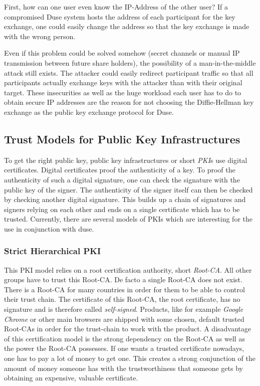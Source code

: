 First, how can one user even know the IP-Address of the other user? If a compromised
Duse system hosts the address of each participant for the key exchange, one could
easily change the address so that the key exchange is made with the wrong person.

Even if this problem could be solved somehow (secret channels or manual IP transmission
between future share holders), the possibility of a man-in-the-middle attack still
exists. The attacker could easily redirect participant traffic so that all participants
actually exchange keys with the attacker than with their original target.
These insecurities as well as the huge workload each user has to do to obtain
secure IP addresses are the reason for not choosing the Diffie-Hellman key exchange
as the public key exchange protocol for Duse.

\subsection{Trust Models for Public Key Infrastructures}

To get the right public key, public key infrastructures or short \textit{PKI}s use
digital certificates. Digital certificates proof the authenticity of a key. To proof
the authenticity of such a digital signature, one can check the signature with the
public key of the signer. The authenticity of the signer itself can then be checked
by checking another digital signature. This builds up a chain of signatures and 
signers relying on each other and ends on a single certificate which has to be trusted.
Currently, there are several models of PKIs which are interesting for the use
in conjunction with duse.

\subsubsection{Strict Hierarchical PKI}

This PKI model relies on a root certification authority, short \textit{Root-CA}.
All other groups have to trust this Root-CA.
De facto a single Root-CA does not exist. There is a Root-CA for many countries
in order for them to be able to control their trust chain.
The certificate of this Root-CA, the
root certificate, has no signature and is therefore called \textit{self-signed}.
Products, like for example \textit{Google Chrome} or other main browsers are
shipped with some chosen, default trusted Root-CAs in order for the trust-chain
to work with the product. A disadvantage of this certification model is the
strong dependency on the Root-CA as well as the power the Root-CA possesses.
If one wants a trusted certificate nowadays, one has to pay a lot of money to
get one. This creates a strong conjunction of the amount of money someone has with
the trustworthiness that someone gets by obtaining an expensive, valuable certificate.


